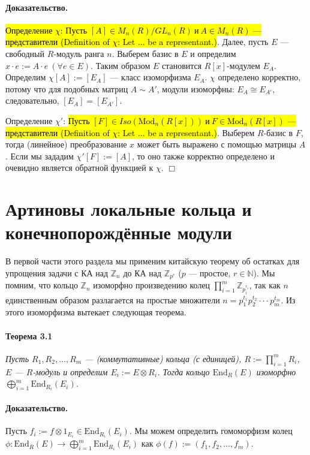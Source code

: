 \documentclass[a4paper,12pt]{article}
\newcommand{\Endom}{\text{End}}
\newcommand{\Mod}{\text{Mod}}
\begin{document}
\paragraph{Доказательство.}
\hl{Определение $\chi$: Пусть $[A] \in M_n(R)/GL_n(R) ~ и ~ A \in M_n(R)$ --- представители (Definition of $\chi$: Let ... be a representant.)}.
Далее, пусть $E$ --- свободный $R$-модуль ранга $n$. Выберем базис в $E$ и определим $x \cdot e := A \cdot e ~ (\forall e \in E)$. Таким образом $E$ становится $R[x]$-модулем $E_A$. Определим $\chi [A] := [E_A]$ --- класс изоморфизма $E_A$. $\chi$ определено корректно, потому что для подобных матриц $A \sim A'$, модули изоморфны: $E_A \cong E_{A'}$, следовательно, $[E_A] = [E_{A'}]$.

Определение $\chi'$: \hl{Пусть $[F] \in Iso(\Mod_n(R[x])) ~ и ~ F \in \Mod_n(R[x])$ --- представители (Definition of $\chi$: Let ... be a representant.)}. Выберем $R$-базис в $F$, тогда (линейное) преобразование $x$ может быть выражено с помощью матрицы $A$. Если мы зададим $\chi'[F] := [A]$, то оно также корректно определено и очевидно является обратной функцией к $\chi$.  $\Box$

\section{Артиновы локальные кольца и конечнопорождённые модули}

В первой части этого раздела мы применим китайскую теорему об остатках для упрощения задачи с КА над $\mathbb{Z}_{n}$ до КА над $\mathbb{Z}_{p^r}$ ($p$ --- простое, $r \in \mathbb{N}$).
Мы помним, что кольцо $\mathbb{Z}_{n}$ изоморфно произведению колец $\prod_{i=1}^{m} { {\mathbb{Z}}_{{p_{i}^{r_{i}}}}}$, так как $n$ единственным образом разлагается на простые множители $n = p_1^{t_1} p_2^{t_2} \cdot \cdot \cdot p_m^{t_m}$. Из этого изоморфизма вытекает следующая теорема. 

\paragraph{Теорема 3.1}{\itshape
Пусть $R_1, R_2, ..., R_m$ --- (коммутативные) кольца (с единицей), $R:=\prod_{i=1}^{m}R_i$, $E$ --- $R$-модуль и определим $E_i := E \otimes R_i$. Тогда кольцо $\Endom_R(E)$ изоморфно $\bigoplus_{i=1}^{m}\Endom_{R_i}(E_i)$.
}
\paragraph{Доказательство.}
Пусть $f_i := f\otimes1_{E_i} \in \Endom_{R_i}(E_i)$. Мы можем определить гомоморфизм колец $\phi : \Endom_R(E) \rightarrow \bigoplus_{i=1}^{m} \Endom_{R_i} (E_i)$ как $\phi(f) := (f_1, f_2, ..., f_m)$. 
\end{document}
